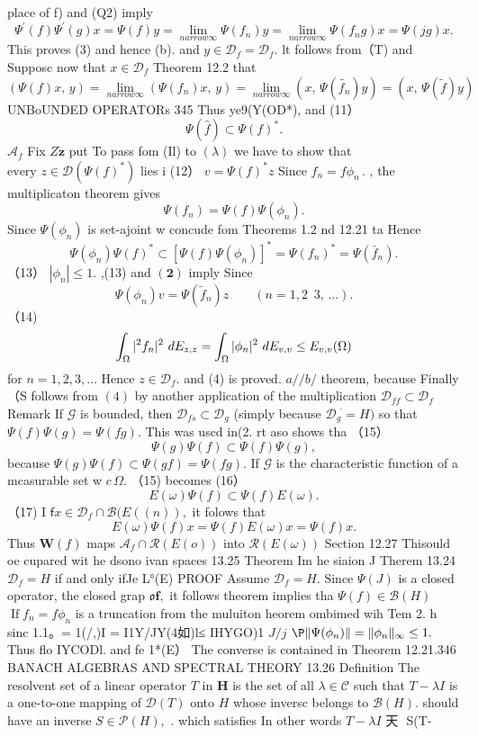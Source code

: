 place of f) and (Q2) imply $$ \Psi^{\prime}(f)\Psi^{\prime}(g)x=\Psi(f)y=\operatorname*{lim}_{n arrow\infty}\Psi(f_{n})y=\operatorname*{lim}_{n arrow\infty}\Psi(f_{n}g)x=\Psi(j g)x. $$ This proves (3) and hence (b). and $y\in{\mathcal{D}}_{f}={\mathcal{D}}_{f}.$ lt follows from（T) and Supposc now that $x\in{\mathcal{D}}_{f}$ Theorem 12.2 that $$ (\Psi(f)x,\,y)=\operatorname*{lim}_{n arrow\infty}(\Psi(f_{n})x,\,y)=\operatorname*{lim}_{n arrow\infty}(x,\,\Psi(\tilde{f_{n}})y)=(x,\,\Psi(\tilde{f})y) $$UNBoUNDED OPERATORs 345 Thus ye9(Y(OD*), and (11） $$ \Psi(\hat{f})\subset\Psi(f)^{*}. $$ ${\mathcal{A}}_{f}$ Fix $Z{\dot{\boldsymbol{z}}}$ put To pass fom (Il) to $(\lambda)$ we have to show that $\mathrm{every}\,\,z\in{\mathcal{D}}(\Psi(f)^{*})$ lies i (12） $v=\Psi(f)^{*}z$ Since $f_{n}=f\phi_{n}\,.$ , the multiplicaton theorem gives $$ \Psi(f_{n})=\Psi(f)\Psi(\phi_{n}). $$ Since $\Psi(\phi_{n})$ is set-ajoint w concude fom Theorems 1.2 nd 12.21 ta Hence $$ \Psi(\phi_{n})\Psi(f)^{*}\subset[\Psi(f)\Psi(\phi_{n})]^{*}=\Psi(f_{n})^{*}=\Psi(\bar{f}_{n}). $$ （13） $|\phi_{n}|\leq1.$ ,(13) and $\mathbf{(2)}$ imply Since $$ \Psi(\phi_{n})v=\Psi(\tilde{f}_{n})z\qquad(n=1,2\,\,\,3,\,\ldots). $$ （14) $$ \int_{\Omega}|\sp{2}f_{n}|\sp2\ d E_{z,z}=\int_{\Omega}|\phi_{n}|\sp2\ d E_{v,v}\leq E_{v,v}(\Omega) $$ for $n=1,2,3,\ldots$ Hence $z\in{\mathcal{D}}_{f}.$ and (4) is proved. ${a\!\!\!/}/{b\!\!\!/}$ theorem, because Finally（S follows from $(4)$ by another application of the multiplication ${\mathcal{D}}_{f f}\subset{\mathcal{D}}_{f}$ Remark If $\mathcal{G}$ is bounded, then $\mathcal{D}_{f s}\subset\mathcal{D}_{g}$ (simply because ${\mathcal{D}}_{g}^{\,\,\cdot}=H)$ so that $\Psi(f)\Psi(g)=\Psi(f g).$ This was uscd in(2. rt aso shows tha （15） $$ \Psi(g)\Psi(f)\subset\Psi(f)\Psi(g), $$ because $\Psi(g)\Psi(f)\subset\Psi(g f)=\Psi(f g).$ If $\scriptstyle{\mathcal{G}}$ is the characteristic function of a mcasurable set w $c\,\Omega.$ （15) becomes (16） $$ E(\omega)\Psi(f)\subset\Psi(f)E(\omega). $$ （17) I ${\textsf{f}}x\in{\mathcal{D}}_{f}\cap{\mathcal{B}}(E(\!(n)),$ it folows that $$ E(\omega)\Psi(f)x=\Psi(f)E(\omega)x=\Psi(f)x. $$ Thus $\mathbf{W}(f)$ maps ${\mathcal{A}}_{f}\cap{\mathcal{R}}(E(o))$ into ${\mathcal{R}}(E(\omega))$ Section 12.27 Thisould oe cupared wit he dsono ivan spaces 13.25 Theorem Im he siaion J Therem 13.24 ${\mathcal{D}}_{f}=H$ if and only ifJe L°(E) PROOF Assume ${\mathcal{D}}_{f}=H.$ Since $\Psi(J)$ is a closed operator, the closed grap ${\mathfrak{o}}\mathbf{f},$ it follows theorem implies tha $\Psi(f)\in{\mathcal{B}}(H)$ $\operatorname{If}f_{n}=f\phi_{n}$ is a truncation from the muluiton heorem ombimed wih Tem 2. h sinc 1.1。= 1(/,)I = I1Y/JY(4如)l≤ IHYGO)1 $J/j$ $\P\Vert\Psi(\phi_{n})\Vert=\Vert\phi_{n}\Vert_{\infty}\leq1.$ Thus flo IYCODl. and fe 1*(E） The converse is contained in Theorem 12.21.346 BANACH ALGEBRAS AND SPECTRAL THEORY 13.26 Definition The resolvent set of a linear operator ${\mathbf{}}T$ in ${\boldsymbol{H}}$ is the set of all $\lambda\in{\mathcal{C}}$ such that $T-\lambda I$ is a one-to-one mapping of ${\mathcal{D}}(T)$ onto $H$ whose inversc belongs to ${\mathcal{B}}(H).$ should have an inverse $S\in{\mathcal{P}}(H),$ . which satisfies In other words $T-\lambda I$ 天 $$ S(T-\lambda 